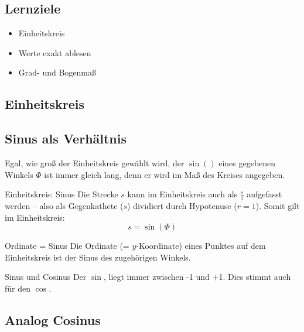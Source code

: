 \subsection*{Lernziele}

\begin{itemize}
\item Einheitskreis
\item Werte exakt ablesen
\item Grad- und Bogenmaß
\end{itemize}

\newpage
\subsection{Einheitskreis}





\subsection{Sinus als Verhältnis}
Egal, wie groß der Einheitskreis gewählt wird, der $\sin()$ eines
gegebenen Winkels $\Phi$ ist immer gleich lang, denn er wird im Maß
des Kreises angegeben.


\begin{gesetz}{Einheitskreis: Sinus}{}
  Die Strecke $s$ kann im Einheitskreis auch als $\frac{s}1$ aufgefasst werden -- also
  als Gegenkathete ($s$) dividiert durch Hypotenuse ($r=1$). Somit
  gilt im Einheitskreis:
  $$s = \sin(\Phi)$$
\end{gesetz}

\begin{bemerkung}{Ordinate = Sinus}{}
  Die Ordinate (= $y$-Koordinate) eines Punktes auf dem Einheitskreis ist
  der Sinus des zugehörigen Winkels.
\end{bemerkung}

\begin{bemerkung}{Sinus und Cosinus}{}
Der $\sin{}$, liegt immer zwischen -1 und
+1. Dies stimmt auch für den $\cos{}$.
\end{bemerkung}


\newpage

\subsection{Analog Cosinus}

